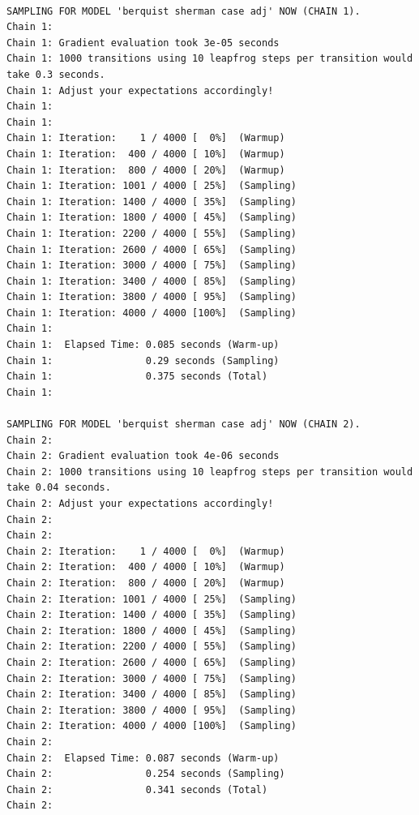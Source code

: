 \documentclass[
  letterpaper,
  DIV=11,
  numbers=noendperiod]{scrartcl}
\begin{document}
\begin{verbatim}

SAMPLING FOR MODEL 'berquist sherman case adj' NOW (CHAIN 1).
Chain 1: 
Chain 1: Gradient evaluation took 3e-05 seconds
Chain 1: 1000 transitions using 10 leapfrog steps per transition would take 0.3 seconds.
Chain 1: Adjust your expectations accordingly!
Chain 1: 
Chain 1: 
Chain 1: Iteration:    1 / 4000 [  0%]  (Warmup)
Chain 1: Iteration:  400 / 4000 [ 10%]  (Warmup)
Chain 1: Iteration:  800 / 4000 [ 20%]  (Warmup)
Chain 1: Iteration: 1001 / 4000 [ 25%]  (Sampling)
Chain 1: Iteration: 1400 / 4000 [ 35%]  (Sampling)
Chain 1: Iteration: 1800 / 4000 [ 45%]  (Sampling)
Chain 1: Iteration: 2200 / 4000 [ 55%]  (Sampling)
Chain 1: Iteration: 2600 / 4000 [ 65%]  (Sampling)
Chain 1: Iteration: 3000 / 4000 [ 75%]  (Sampling)
Chain 1: Iteration: 3400 / 4000 [ 85%]  (Sampling)
Chain 1: Iteration: 3800 / 4000 [ 95%]  (Sampling)
Chain 1: Iteration: 4000 / 4000 [100%]  (Sampling)
Chain 1: 
Chain 1:  Elapsed Time: 0.085 seconds (Warm-up)
Chain 1:                0.29 seconds (Sampling)
Chain 1:                0.375 seconds (Total)
Chain 1: 

SAMPLING FOR MODEL 'berquist sherman case adj' NOW (CHAIN 2).
Chain 2: 
Chain 2: Gradient evaluation took 4e-06 seconds
Chain 2: 1000 transitions using 10 leapfrog steps per transition would take 0.04 seconds.
Chain 2: Adjust your expectations accordingly!
Chain 2: 
Chain 2: 
Chain 2: Iteration:    1 / 4000 [  0%]  (Warmup)
Chain 2: Iteration:  400 / 4000 [ 10%]  (Warmup)
Chain 2: Iteration:  800 / 4000 [ 20%]  (Warmup)
Chain 2: Iteration: 1001 / 4000 [ 25%]  (Sampling)
Chain 2: Iteration: 1400 / 4000 [ 35%]  (Sampling)
Chain 2: Iteration: 1800 / 4000 [ 45%]  (Sampling)
Chain 2: Iteration: 2200 / 4000 [ 55%]  (Sampling)
Chain 2: Iteration: 2600 / 4000 [ 65%]  (Sampling)
Chain 2: Iteration: 3000 / 4000 [ 75%]  (Sampling)
Chain 2: Iteration: 3400 / 4000 [ 85%]  (Sampling)
Chain 2: Iteration: 3800 / 4000 [ 95%]  (Sampling)
Chain 2: Iteration: 4000 / 4000 [100%]  (Sampling)
Chain 2: 
Chain 2:  Elapsed Time: 0.087 seconds (Warm-up)
Chain 2:                0.254 seconds (Sampling)
Chain 2:                0.341 seconds (Total)
Chain 2: 


\end{verbatim}
\end{document}
